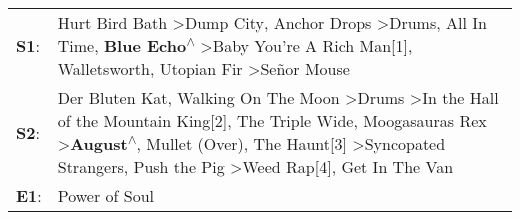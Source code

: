 \begin{supertabular}{p{0.03\textwidth}p{0.92\textwidth}}
 \textbf{S1}:  &                                                                                                                                                                             Hurt Bird Bath\textsuperscript{} \textgreater \enspace Dump City\textsuperscript{}, \enspace Anchor Drops\textsuperscript{} \textgreater \enspace Drums\textsuperscript{}, \enspace All In Time\textsuperscript{}, \enspace \textbf{Blue Echo\textsuperscript{$\wedge$}} \textgreater \enspace Baby You're A Rich Man[1]\textsuperscript{}, \enspace Walletsworth\textsuperscript{}, \enspace Utopian Fir\textsuperscript{} \textgreater \enspace Señor Mouse\textsuperscript{}  \enspace  \\
 \textbf{S2}:  &  Der Bluten Kat\textsuperscript{}, \enspace Walking On The Moon\textsuperscript{} \textgreater \enspace Drums\textsuperscript{} \textgreater \enspace In the Hall of the Mountain King[2]\textsuperscript{}, \enspace The Triple Wide\textsuperscript{}, \enspace Moogasauras Rex\textsuperscript{} \textgreater \enspace \textbf{August\textsuperscript{$\wedge$}}, \enspace Mullet (Over)\textsuperscript{}, \enspace The Haunt[3]\textsuperscript{} \textgreater \enspace Syncopated Strangers\textsuperscript{}, \enspace Push the Pig\textsuperscript{} \textgreater \enspace Weed Rap[4]\textsuperscript{}, \enspace Get In The Van\textsuperscript{}  \enspace  \\
 \textbf{E1}:  &                                                                                                                                                                                                                                                                                                                                                                                                                                                                                                                                                                                                                             Power of Soul\textsuperscript{}  \enspace  \\
\end{supertabular}
